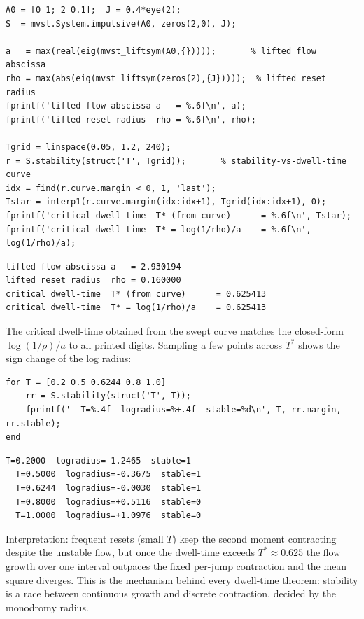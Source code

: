 \documentclass[11pt,oneside]{report}
\begin{document}
\begin{lstlisting}[style=matlabstyle]
A0 = [0 1; 2 0.1];  J = 0.4*eye(2);
S  = mvst.System.impulsive(A0, zeros(2,0), J);

a   = max(real(eig(mvst_liftsym(A0,{}))));       % lifted flow abscissa
rho = max(abs(eig(mvst_liftsym(zeros(2),{J}))));  % lifted reset radius
fprintf('lifted flow abscissa a   = %.6f\n', a);
fprintf('lifted reset radius  rho = %.6f\n', rho);

Tgrid = linspace(0.05, 1.2, 240);
r = S.stability(struct('T', Tgrid));       % stability-vs-dwell-time curve
idx = find(r.curve.margin < 0, 1, 'last');
Tstar = interp1(r.curve.margin(idx:idx+1), Tgrid(idx:idx+1), 0);
fprintf('critical dwell-time  T* (from curve)      = %.6f\n', Tstar);
fprintf('critical dwell-time  T* = log(1/rho)/a    = %.6f\n', log(1/rho)/a);
\end{lstlisting}

\begin{lstlisting}[style=outputstyle]
lifted flow abscissa a   = 2.930194
lifted reset radius  rho = 0.160000
critical dwell-time  T* (from curve)      = 0.625413
critical dwell-time  T* = log(1/rho)/a    = 0.625413
\end{lstlisting}

The critical dwell-time obtained from the swept curve matches the closed-form
\(\log(1/\rho)/a\) to all printed digits. Sampling a few points across \(T^{*}\)
shows the sign change of the log radius:

\begin{lstlisting}[style=matlabstyle]
for T = [0.2 0.5 0.6244 0.8 1.0]
    rr = S.stability(struct('T', T));
    fprintf('  T=%.4f  logradius=%+.4f  stable=%d\n', T, rr.margin, rr.stable);
end
\end{lstlisting}

\begin{lstlisting}[style=outputstyle]
  T=0.2000  logradius=-1.2465  stable=1
  T=0.5000  logradius=-0.3675  stable=1
  T=0.6244  logradius=-0.0030  stable=1
  T=0.8000  logradius=+0.5116  stable=0
  T=1.0000  logradius=+1.0976  stable=0
\end{lstlisting}

Interpretation: frequent resets (small \(T\)) keep the second moment contracting
despite the unstable flow, but once the dwell-time exceeds \(T^{*}\approx0.625\) the
flow growth over one interval outpaces the fixed per-jump contraction and the
mean square diverges. This is the mechanism behind every dwell-time theorem:
stability is a race between continuous growth and discrete contraction, decided
by the monodromy radius.
\end{document}
